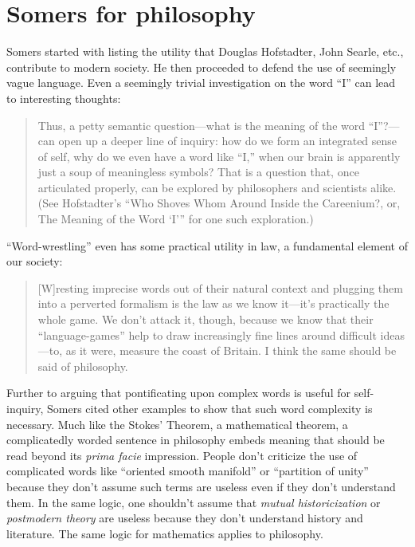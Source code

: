 \documentclass[12pt]{article}
\begin{document}
\section{Somers for philosophy}

Somers started with listing the utility that Douglas Hofstadter, John Searle, etc., contribute to modern society. He then proceeded to defend the use of seemingly vague language. Even a seemingly trivial investigation on the word \enquote{I} can lead to interesting thoughts:
\begin{quotation}
 Thus, a petty semantic question—what is the meaning of the word \enquote{I}?—can open up a deeper line of inquiry: how do we form an integrated sense of self, why do we even have a word like “I,” when our brain is apparently just a soup of meaningless symbols? That is a question that, once articulated properly, can be explored by philosophers and scientists alike. (See Hofstadter’s “Who Shoves Whom Around Inside the Careenium?, or, The Meaning of the Word ‘I’” for one such exploration.)
\end{quotation}

\enquote{Word-wrestling} even has some practical utility in law, a fundamental element of our society:

\begin{quotation}
 [W]resting imprecise words out of their natural context and plugging them into a perverted formalism is the law as we know it—it’s practically the whole game. We don’t attack it, though, because we know that their “language-games” help to draw increasingly fine lines around difficult ideas—to, as it were, measure the coast of Britain. I think the same should be said of philosophy.
\end{quotation}

Further to arguing that pontificating upon complex words is useful for self-inquiry, Somers cited other examples to show that such word complexity is necessary. Much like the Stokes' Theorem, a mathematical theorem, a complicatedly worded sentence in philosophy embeds meaning that should be read beyond its \emph{prima facie} impression. People don't criticize the use of complicated words like \enquote{oriented smooth manifold} or \enquote{partition of unity} because they don't assume such terms are useless even if they don't understand them. In the same logic, one shouldn't assume that \emph{mutual historicization} or \emph{postmodern theory} are useless because they don't understand history and literature. The same logic for mathematics applies to philosophy.
\end{document}
